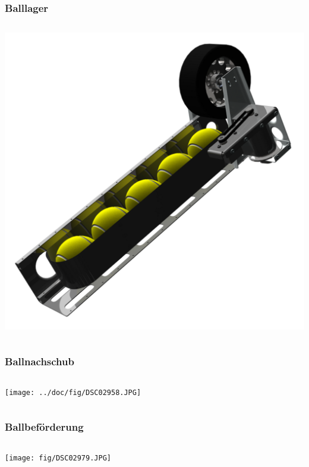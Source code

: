 \begin{frame}
    \frametitle{Balllager}
    \begin{columns}
        \begin{column}{0.7\textwidth}
            \centering
            \includegraphics[width=1.0\textwidth]{FotosM/Bild7.png}
        \end{column}
    \end{columns}
\end{frame}
\begin{frame}
    \frametitle{Ballnachschub}
    \begin{columns}
        \begin{column}{0.8\textwidth}
            \centering
            \texttt{[image: ../doc/fig/DSC02958.JPG]}
        \end{column}
    \end{columns}
\end{frame}
\begin{frame}
    \frametitle{Ballbeförderung}
    \begin{columns}
        \begin{column}{0.8\textwidth}
            \centering
            \texttt{[image: fig/DSC02979.JPG]}
        \end{column}
    \end{columns}
\end{frame}
